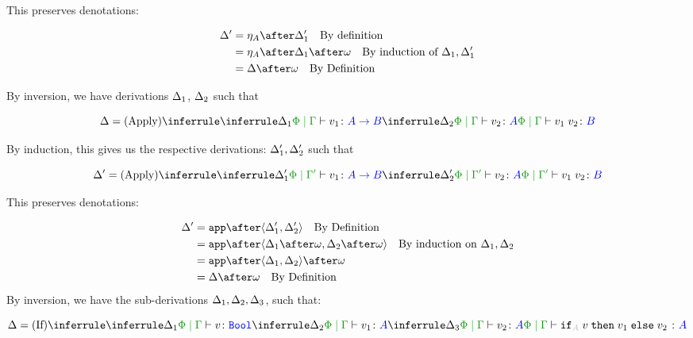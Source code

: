 {    This preserves denotations:

    \begin{align}
        \D' & = \point{A}\after\D_1' \qt{By definition}\\
            & = \point{A}\after\D_1\after\w\qt{By induction of $\D_1, \D_1'$}\\
            & = \D\after\w\qt{By Definition}
    \end{align}

        By inversion, we have derivations $\Delta_1$, $\Delta_2$ such that

        \begin{equation}
            \D = 
            \ntreeruleII{Apply}{
                \treeruleI{\D_1}{\gpetyperelation{v_1}{\ab}}
                }{
                \treeruleI{\D_2}{\gpetyperelation{v_2}{A}}
            } {
                \gpetyperelation{\apply{v_1}{v_2}}{B}
            }
        \end{equation}

        By induction, this gives us the respective derivations: $\Delta_1',\Delta_2'$ such that

        
        \begin{equation}
            \D' = 
            \ntreeruleII{Apply}{
                \treeruleI{\D_1'}{\etyperelation{\P}{\G'}{v_1}{\ab}}
                }{
                \treeruleI{\D_2'}{\etyperelation{\P}{\G'}{v_2}{A}}
            } {
                \etyperelation{\P}{\G'}{\apply{v_1}{v_2}}{B}
            }
        \end{equation}

        This preserves denotations:

        \begin{align}
            \D' &= \app\after\pr{\D_1'}{\D_2'} \qt{By Definition}\\
            &= \app\after\pr{\D_1\after\w}{\D_2\after\w} \qt{By induction on $\D_1, \D_2$}\\
            &= \app\after\pr{\D_1}{\D_2}\after\w\\
            &= \D\after\w\qt{By Definition}
        \end{align}
    By inversion, we have the sub-derivations $\Delta_1,\Delta_2,\Delta_3$, such that:


    \begin{equation}
        \D = \ntreeruleIII{If}{
            \treeruleI{\D_1}{\etyperelation{\P}{\G}{v}{\B}}
            }{
            \treeruleI{\D_2}{\etyperelation{\P}{\G}{v_1}{A}}
            }{
            \treeruleI{\D_3}{\etyperelation{\P}{\G}{v_2}{A}}
        }{
            \etyperelation{\P}{\G}{\pifthenelse{A}{v}{v_1}{v_2}}{A}
        }
    \end{equation}

}
